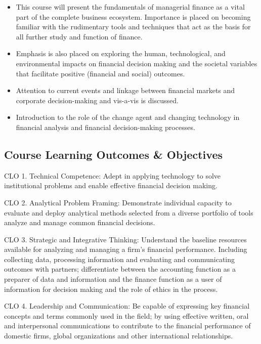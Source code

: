 \documentclass[11pt]{article}
\begin{document}
\begin{itemize}
\item This course will present the fundamentals of managerial finance as a vital part of the complete business ecosystem. Importance is placed on becoming familiar with the rudimentary tools and techniques that act as the basis for all further study and function of finance.

\item Emphasis is also placed on exploring the human, technological, and environmental impacts on financial decision making and the societal variables that facilitate positive (financial and social) outcomes.

\item Attention to current events and linkage between financial markets and corporate decision-making and vis-a-vis is discussed.

\item Introduction to the role of the change agent and changing technology in financial analysis and financial decision-making processes.
\end{itemize}

\subsection{Course Learning Outcomes \& Objectives}
\label{sec:orgf19e2eb}

CLO 1. Technical Competence: Adept in applying technology to solve institutional problems and enable effective financial decision making.

CLO 2. Analytical Problem Framing: Demonstrate individual capacity to evaluate and deploy analytical methods selected from a diverse portfolio of tools analyze and manage common financial decisions.

CLO 3. Strategic and Integrative Thinking: Understand the baseline resources available for analyzing and managing a firm’s financial performance. Including collecting data, processing information and evaluating and communicating outcomes with partners; differentiate between the accounting function as a preparer of data and information and the finance function as a user of information for decision making and the role of ethics in the process.

CLO 4. Leadership and Communication: Be capable of expressing key financial concepts and terms commonly used in the field; by using effective written, oral and interpersonal communications to contribute to the financial performance of domestic firms, global organizations and other international relationships.
\end{document}
